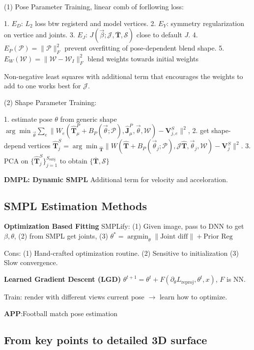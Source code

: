 (1) Pose Parameter Training, linear comb of forllowing loss: 

1. \(E_D\): \(L_2\) loss btw registerd and model vertices. 
2. \(E_Y\): symmetry regularization on vertice and joints. 
3. \(E_J\): \(J(\vec{\beta} ; \mathcal{J}, \overline{\mathbf{T}}, \mathcal{S})\) close to default \(J\). 
4. \(E_{P}(\mathcal{P})=\|\mathcal{P}\|_{F}^{2}\) prevent overfitting of pose-dependent blend shape. 
5. \(E_{W}(\mathcal{W})=\|\mathcal{W}-\mathcal{W}_{I}\|_{F}^{2}\) blend weights towards initial weights

Non-negative least squares with additional term that encourages the weights to add to one works best for \(\mathcal{J}\).

(2) Shape Parameter Training:

1. estimate pose \(\theta\) from generic shape \({\arg \min}_{{\vec{\theta}}} \sum_{e}\|W_{e}(\hat{\mathbf{T}}_{\mu}^{P}+B_{P}(\vec{\theta} ; \mathcal{P}), \hat{\mathbf{J}}_{\mu}^{P}, \vec{\theta}, \mathcal{W})-\mathbf{V}_{j, e}^{S}\|^{2}\), 
2. get shape-depend vertices \(\hat{\mathbf{T}}_{j}^{S}={\arg \min }_{\hat{\mathbf{T}}} \|W(\hat{\mathbf{T}}+B_{P}(\vec{\theta}_{j} ; \mathcal{P}), \mathcal{J} \hat{\mathbf{T}}, \vec{\theta}_{j}, \mathcal{W})-\mathbf{V}_{j}^{S}\|^{2}\).
3. PCA on \(\{\hat{\mathbf{T}}_{j}^{S}\}_{j=1}^{S_{\text {subj }}}\) to obtain \(\{\overline{\mathbf{T}}, \mathcal{S}\}\)


\textbf{DMPL: Dynamic SMPL} Additional term for velocity and acceloration.


\subsection*{SMPL Estimation Methods}

\textbf{Optimization Based Fitting} SMPLify: (1) Given image, pass to DNN to get \(\beta, \theta\), (2) from SMPL get joints, (3) \(\theta^{*}={\operatorname{argmin}}_{\theta} \| \text{Joint diff}\| + \text{Prior Reg}\)

Cons: (1) Hand-crafted optimization routine. (2) Sensitive to initialization (3) Slow convergence.

\textbf{Learned Gradient Descent (LGD)} \(\theta^{t+1}=\theta^{t}+F(\partial_{\theta} L_{\text {reproj}}, \theta^{t}, x)\), \(F\) is NN.

Train: render with different views current pose \(\to\) learn how to optimize.

\textbf{APP}:Football match pose estimation

\subsection*{From key points to detailed 3D surface}

